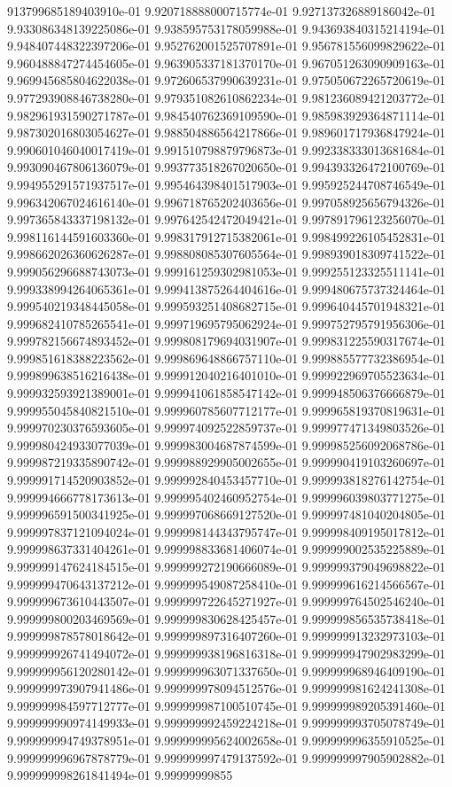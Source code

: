 913799685189403910e-01	9.920718888000715774e-01	9.927137326889186042e-01	9.933086348139225086e-01	9.938595753178059988e-01	9.943693840315214194e-01	9.948407448322397206e-01	9.952762001525707891e-01	9.956781556099829622e-01	9.960488847274454605e-01	9.963905337181370170e-01	9.967051263090909163e-01	9.969945685804622038e-01	9.972606537990639231e-01	9.975050672265720619e-01	9.977293908846738280e-01	9.979351082610862234e-01	9.981236089421203772e-01	9.982961931590271787e-01	9.984540762369109590e-01	9.985983929364871114e-01	9.987302016803054627e-01	9.988504886564217866e-01	9.989601717936847924e-01	9.990601046040017419e-01	9.991510798879796873e-01	9.992338333013681684e-01	9.993090467806136079e-01	9.993773518267020650e-01	9.994393326472100769e-01	9.994955291571937517e-01	9.995464398401517903e-01	9.995925244708746549e-01	9.996342067024616140e-01	9.996718765202403656e-01	9.997058925656794326e-01	9.997365843337198132e-01	9.997642542472049421e-01	9.997891796123256070e-01	9.998116144591603360e-01	9.998317912715382061e-01	9.998499226105452831e-01	9.998662026360626287e-01	9.998808085307605564e-01	9.998939018309741522e-01	9.999056296688743073e-01	9.999161259302981053e-01	9.999255123325511141e-01	9.999338994264065361e-01	9.999413875264404616e-01	9.999480675737324464e-01	9.999540219348445058e-01	9.999593251408682715e-01	9.999640445701948321e-01	9.999682410785265541e-01	9.999719695795062924e-01	9.999752795791956306e-01	9.999782156674893452e-01	9.999808179694031907e-01	9.999831225590317674e-01	9.999851618388223562e-01	9.999869648866757110e-01	9.999885577732386954e-01	9.999899638516216438e-01	9.999912040216401010e-01	9.999922969705523634e-01	9.999932593921389001e-01	9.999941061858547142e-01	9.999948506376666879e-01	9.999955045840821510e-01	9.999960785607712177e-01	9.999965819370819631e-01	9.999970230376593605e-01	9.999974092522859737e-01	9.999977471349803526e-01	9.999980424933077039e-01	9.999983004687874599e-01	9.999985256092068786e-01	9.999987219335890742e-01	9.999988929905002655e-01	9.999990419103260697e-01	9.999991714520903852e-01	9.999992840453457710e-01	9.999993818276142754e-01	9.999994666778173613e-01	9.999995402460952754e-01	9.999996039803771275e-01	9.999996591500341925e-01	9.999997068669127520e-01	9.999997481040204805e-01	9.999997837121094024e-01	9.999998144343795747e-01	9.999998409195017812e-01	9.999998637331404261e-01	9.999998833681406074e-01	9.999999002535225889e-01	9.999999147624184515e-01	9.999999272190666089e-01	9.999999379049698822e-01	9.999999470643137212e-01	9.999999549087258410e-01	9.999999616214566567e-01	9.999999673610443507e-01	9.999999722645271927e-01	9.999999764502546240e-01	9.999999800203469569e-01	9.999999830628425457e-01	9.999999856535738418e-01	9.999999878578018642e-01	9.999999897316407260e-01	9.999999913232973103e-01	9.999999926741494072e-01	9.999999938196816318e-01	9.999999947902983299e-01	9.999999956120280142e-01	9.999999963071337650e-01	9.999999968946409190e-01	9.999999973907941486e-01	9.999999978094512576e-01	9.999999981624241308e-01	9.999999984597712777e-01	9.999999987100510745e-01	9.999999989205391460e-01	9.999999990974149933e-01	9.999999992459224218e-01	9.999999993705078749e-01	9.999999994749378951e-01	9.999999995624002658e-01	9.999999996355910525e-01	9.999999996967878779e-01	9.999999997479137592e-01	9.999999997905902882e-01	9.999999998261841494e-01	9.99999999855